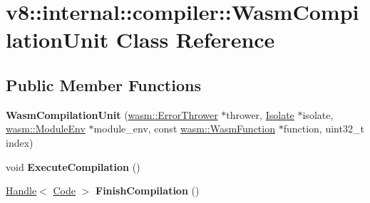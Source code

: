 \hypertarget{classv8_1_1internal_1_1compiler_1_1_wasm_compilation_unit}{}\section{v8\+:\+:internal\+:\+:compiler\+:\+:Wasm\+Compilation\+Unit Class Reference}
\label{classv8_1_1internal_1_1compiler_1_1_wasm_compilation_unit}
\subsection*{Public Member Functions}
\begin{DoxyCompactItemize}
\item 
{\bfseries Wasm\+Compilation\+Unit} (\hyperlink{classv8_1_1internal_1_1wasm_1_1_error_thrower}{wasm\+::\+Error\+Thrower} $\ast$thrower, \hyperlink{classv8_1_1internal_1_1_isolate}{Isolate} $\ast$isolate, \hyperlink{structv8_1_1internal_1_1wasm_1_1_module_env}{wasm\+::\+Module\+Env} $\ast$module\+\_\+env, const \hyperlink{structv8_1_1internal_1_1wasm_1_1_wasm_function}{wasm\+::\+Wasm\+Function} $\ast$function, uint32\+\_\+t index)\hypertarget{classv8_1_1internal_1_1compiler_1_1_wasm_compilation_unit_a7aa43ad3f34cbe45a1a7231f1fc5e92a}{}\label{classv8_1_1internal_1_1compiler_1_1_wasm_compilation_unit_a7aa43ad3f34cbe45a1a7231f1fc5e92a}

\item 
void {\bfseries Execute\+Compilation} ()\hypertarget{classv8_1_1internal_1_1compiler_1_1_wasm_compilation_unit_a76a0f4597a0be6d2452d88e1a1781e36}{}\label{classv8_1_1internal_1_1compiler_1_1_wasm_compilation_unit_a76a0f4597a0be6d2452d88e1a1781e36}

\item 
\hyperlink{classv8_1_1internal_1_1_handle}{Handle}$<$ \hyperlink{classv8_1_1internal_1_1_code}{Code} $>$ {\bfseries Finish\+Compilation} ()\hypertarget{classv8_1_1internal_1_1compiler_1_1_wasm_compilation_unit_ab9b0aec9bbc3eaf6cb93180787b6c154}{}\label{classv8_1_1internal_1_1compiler_1_1_wasm_compilation_unit_ab9b0aec9bbc3eaf6cb93180787b6c154}

\end{DoxyCompactItemize}
